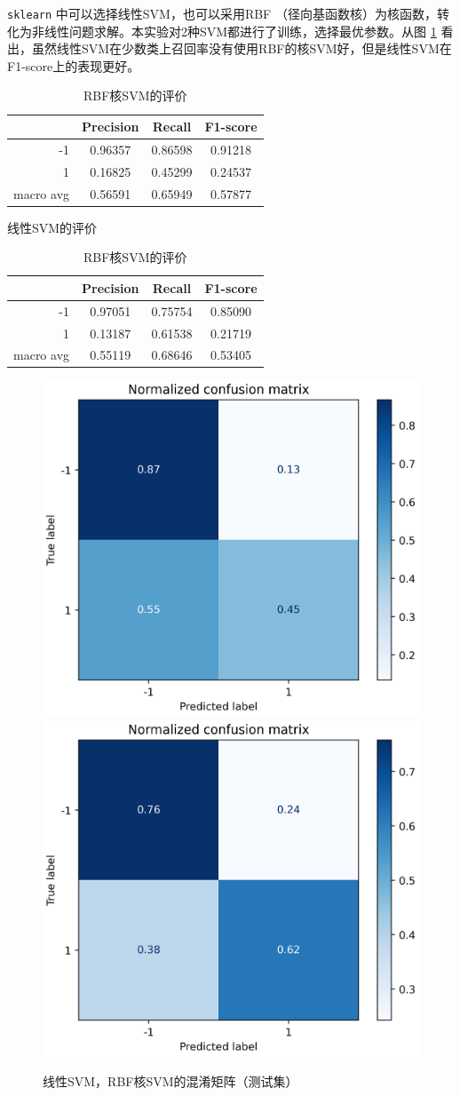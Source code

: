 \documentclass[a4paper]{article}
\begin{document}
\texttt{sklearn} 中可以选择线性SVM，也可以采用RBF （径向基函数核）为核函数，转化为非线性问题求解。本实验对2种SVM都进行了训练，选择最优参数。从图 \ref{fig:result:svm} 看出，虽然线性SVM在少数类上召回率没有使用RBF的核SVM好，但是线性SVM在F1-score上的表现更好。

\begin{table}[!h]
\renewcommand{\arraystretch}{1.5}
\parbox{.45\linewidth}{
\centering
    \begin{tabular}{|r|c|c|c|}
        \hline
                  & Precision & Recall & F1-score \\ \hline
        -1        &     0.96357     &     0.86598   &    0.91218      \\ \hline
        1         &     0.16825      &     0.45299   &   0.24537       \\ \hline
        macro avg &      0.56591     &     0.65949   &    0.57877      \\ \hline
    \end{tabular}
    \caption{线性SVM的评价}
}
\hfill
\parbox{.45\linewidth}{
\centering
    \begin{tabular}{|r|c|c|c|}
        \hline
                  & Precision & Recall & F1-score \\ \hline
        -1        &     0.97051     &     0.75754   &    0.85090      \\ \hline
        1         &     0.13187      &     0.61538   &   0.21719       \\ \hline
        macro avg &      0.55119     &     0.68646   &    0.53405      \\ \hline
    \end{tabular}
    \caption{RBF核SVM的评价}
}
\end{table}


\begin{figure}[!h]
    \centering
    \includegraphics[width=0.48\linewidth]{LinearSVC_confus_mat-norm.png}
    \includegraphics[width=0.48\linewidth]{svm_confus_mat-norm.png}
    \caption{线性SVM，RBF核SVM的混淆矩阵（测试集）}
    \label{fig:result:svm}
\end{figure}
\end{document}

